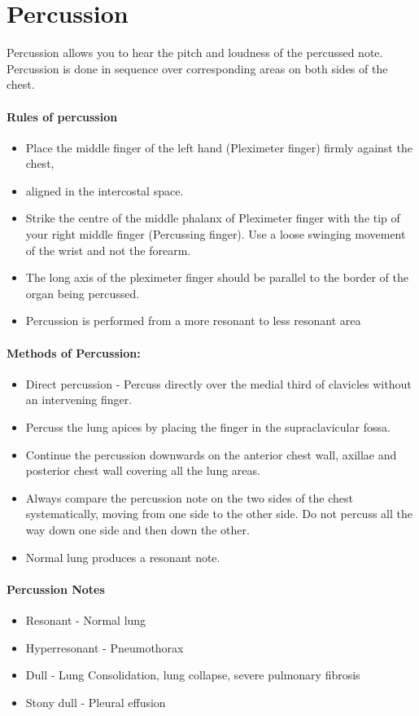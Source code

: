 \documentclass[a4paper,12pt]{book}
\begin{document}
\section*{Percussion}
Percussion  allows  you  to  hear  the  pitch  and  loudness  of  the  percussed  note.  Percussion is done in sequence over corresponding areas on both sides of the chest.

\paragraph{Rules of percussion}
\begin{itemize}
\item{Place the middle finger of the left hand (Pleximeter finger) firmly against the chest,}
\item{aligned in the intercostal space.}
\item{Strike the centre of the middle phalanx of Pleximeter finger with the tip of your right middle finger (Percussing finger). Use a loose swinging movement of the wrist and not the forearm.}
\item{The long axis of the pleximeter finger should be parallel to the border of the organ being percussed.}
\item{Percussion is performed from a more resonant to less resonant area}
\end{itemize}

\paragraph{Methods of Percussion:}
\begin{itemize}
\item{Direct  percussion  -  Percuss  directly  over  the  medial  third  of  clavicles  without  an intervening finger.}
\item{Percuss the lung apices by placing the finger in the supraclavicular fossa.}
\item{Continue the percussion downwards on the anterior chest wall, axillae and posterior chest wall covering all the lung areas.}
\item{Always  compare  the  percussion  note  on  the  two  sides  of  the  chest systematically, moving from one side to the other side. Do not percuss all the way down one side and then down the other.}
\item{Normal lung produces a resonant note.}
\end{itemize}

\paragraph{Percussion Notes}
\begin{itemize}
\item{Resonant 		- 	Normal lung}
\item{Hyperresonant 	-	Pneumothorax}
\item{Dull 			-	Lung Consolidation, lung collapse, severe pulmonary 					fibrosis }
\item{Stony dull 		-	Pleural effusion}
\end{itemize}
\end{document}
